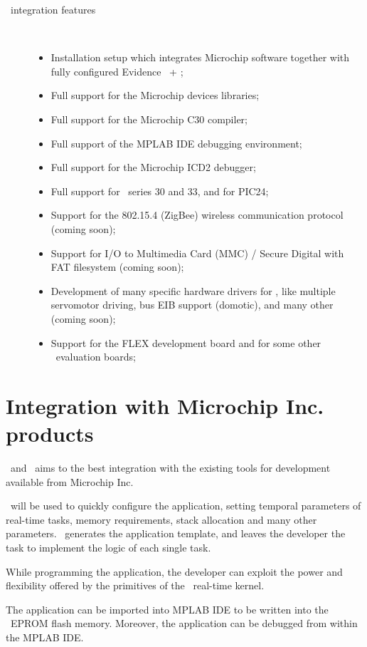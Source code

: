 \begin{description}
\item[\dspic\ integration features] ~
  \begin{itemize}
  \item Installation setup which integrates Microchip software
    together with fully configured Evidence \ee\ + \rtd;
  \item Full support for the Microchip devices libraries;
  \item Full support for the Microchip C30 compiler;
  \item Full support of the MPLAB IDE debugging environment;
  \item Full support for the Microchip ICD2 debugger;
  \item Full support for \dspic\ series 30 and 33, and for PIC24;
  \item Support for the 802.15.4 (ZigBee) wireless communication
    protocol (coming soon);
  \item Support for I/O to Multimedia Card (MMC) / Secure Digital with
    FAT filesystem (coming soon);
  \item Development of many specific hardware drivers for \dspic, like
    multiple servomotor driving, bus EIB support (domotic), and many
    other (coming soon);
  \item Support for the FLEX development board and for some other
    \dspic\ evaluation boards;
  \end{itemize}
\end{description}


\section{Integration with Microchip Inc. products}

\ee\ and \rtd\ aims to the best integration with the existing tools
for development available from Microchip Inc.

\rtd\ will be used to quickly configure the application, setting
temporal parameters of real-time tasks, memory requirements, stack
allocation and many other parameters. \rtd\ generates the application
template, and leaves the developer the task to implement the logic of
each single task.

While programming the application, the developer can exploit the power
and flexibility offered by the primitives of the \ee\ real-time
kernel.

The application can be imported into MPLAB IDE to be written into the
\dspic\ EPROM flash memory. Moreover, the application can be debugged
from within the MPLAB IDE.

